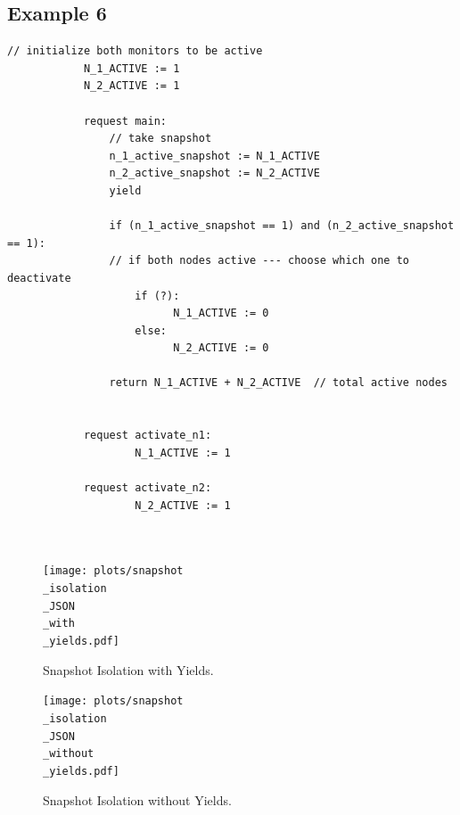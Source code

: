 \subsection{Example 6}


\begin{minipage}[t]{1.0\textwidth}
	\begin{lstlisting}[caption={Snapshot-based monitor deactivation (not serializable, as it can return a sume of 0 active monitors)}]
			// initialize both monitors to be active
			N_1_ACTIVE := 1
			N_2_ACTIVE := 1
			
			request main:
				// take snapshot
				n_1_active_snapshot := N_1_ACTIVE
				n_2_active_snapshot := N_2_ACTIVE
				yield
				
				if (n_1_active_snapshot == 1) and (n_2_active_snapshot == 1):
				// if both nodes active --- choose which one to deactivate 
					if (?): 
						  N_1_ACTIVE := 0
					else:
						  N_2_ACTIVE := 0
					
				return N_1_ACTIVE + N_2_ACTIVE  // total active nodes
				
			
			request activate_n1:
				    N_1_ACTIVE := 1
			
			request activate_n2:
				    N_2_ACTIVE := 1
			
			
		\end{lstlisting}
\end{minipage}




\begin{figure}[h]
	\centering
	\texttt{[image: plots/snapshot\\\_isolation\\\_JSON\\\_with\\\_yields.pdf]}
	\caption{Snapshot Isolation with Yields.}
	\label{fig:snapshotIsolationJsonWithYields}
\end{figure}




\begin{figure}[h]
	\centering
	\texttt{[image: plots/snapshot\\\_isolation\\\_JSON\\\_without\\\_yields.pdf]}
	\caption{Snapshot Isolation without Yields.}
	\label{fig:snapshotIsolationJsonWithoutYields}
\end{figure}


